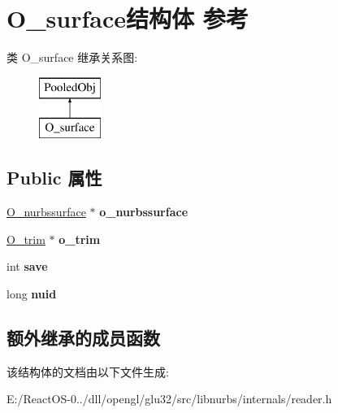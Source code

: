 \hypertarget{struct_o__surface}{}\section{O\+\_\+surface结构体 参考}
\label{struct_o__surface}
类 O\+\_\+surface 继承关系图\+:\begin{figure}[H]
\begin{center}
\leavevmode
\includegraphics[height=2.000000cm]{struct_o__surface}
\end{center}
\end{figure}
\subsection*{Public 属性}
\begin{DoxyCompactItemize}
\item 
\mbox{\label{struct_o__surface_a1f2d13219c94bdfffe4b60ab1b46b253}} 
\hyperlink{struct_o__nurbssurface}{O\+\_\+nurbssurface} $\ast$ {\bfseries o\+\_\+nurbssurface}
\item 
\mbox{\label{struct_o__surface_afc42641583df773ef2c1911e705b0350}} 
\hyperlink{struct_o__trim}{O\+\_\+trim} $\ast$ {\bfseries o\+\_\+trim}
\item 
\mbox{\label{struct_o__surface_a904240bb218327cda6fc8f6e3c25ec53}} 
int {\bfseries save}
\item 
\mbox{\label{struct_o__surface_ac608d3a5219c7840aba43a390f2e8c5e}} 
long {\bfseries nuid}
\end{DoxyCompactItemize}
\subsection*{额外继承的成员函数}


该结构体的文档由以下文件生成\+:\begin{DoxyCompactItemize}
\item 
E\+:/\+React\+O\+S-\/0../dll/opengl/glu32/src/libnurbs/internals/reader.\+h\end{DoxyCompactItemize}
